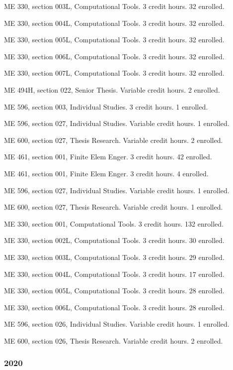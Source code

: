\documentclass[
]{article}
\begin{document}
ME 330, section 003L, Computational Tools. 3 credit hours. 32 enrolled.

ME 330, section 004L, Computational Tools. 3 credit hours. 32 enrolled.

ME 330, section 005L, Computational Tools. 3 credit hours. 32 enrolled.

ME 330, section 006L, Computational Tools. 3 credit hours. 32 enrolled.

ME 330, section 007L, Computational Tools. 3 credit hours. 32 enrolled.

ME 494H, section 022, Senior Thesis. Variable credit hours. 2 enrolled.

ME 596, section 003, Individual Studies. 3 credit hours. 1 enrolled.

ME 596, section 027, Individual Studies. Variable credit hours. 1
enrolled.

ME 600, section 027, Thesis Research. Variable credit hours. 2 enrolled.

ME 461, section 001, Finite Elem Enger. 3 credit hours. 42 enrolled.

ME 461, section 001, Finite Elem Enger. 3 credit hours. 4 enrolled.

ME 596, section 027, Individual Studies. Variable credit hours. 1
enrolled.

ME 600, section 027, Thesis Research. Variable credit hours. 1 enrolled.

ME 330, section 001, Computational Tools. 3 credit hours. 132 enrolled.

ME 330, section 002L, Computational Tools. 3 credit hours. 30 enrolled.

ME 330, section 003L, Computational Tools. 3 credit hours. 29 enrolled.

ME 330, section 004L, Computational Tools. 3 credit hours. 17 enrolled.

ME 330, section 005L, Computational Tools. 3 credit hours. 28 enrolled.

ME 330, section 006L, Computational Tools. 3 credit hours. 28 enrolled.

ME 596, section 026, Individual Studies. Variable credit hours. 1
enrolled.

ME 600, section 026, Thesis Research. Variable credit hours. 2 enrolled.

\subsubsection{2020}\label{section-4}
\end{document}
